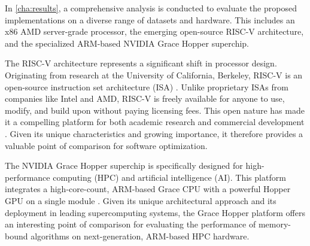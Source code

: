In \cref{cha:results}, a comprehensive analysis is conducted to evaluate the proposed implementations on a diverse range of datasets and hardware. This includes an x86 AMD server-grade processor, the emerging open-source RISC-V architecture, and the specialized ARM-based NVIDIA Grace Hopper superchip.

The RISC-V architecture represents a significant shift in processor design. Originating from research at the University of California, Berkeley, RISC-V is an open-source instruction set architecture (ISA) \cite{asanovic2014instruction}. Unlike proprietary ISAs from companies like Intel and AMD, RISC-V is freely available for anyone to use, modify, and build upon without paying licensing fees. This open nature has made it a compelling platform for both academic research and commercial development \cite{mezger2022survey}. Given its unique characteristics and growing importance, it therefore provides a valuable point of comparison for software optimization.

The NVIDIA Grace Hopper superchip is specifically designed for high-performance computing (HPC) and artificial intelligence (AI). This platform integrates a high-core-count, ARM-based Grace CPU with a powerful Hopper GPU on a single module \cite{elster2022nvidia}. Given its unique architectural approach and its deployment in leading supercomputing systems, the Grace Hopper platform offers an interesting point of comparison for evaluating the performance of memory-bound algorithms on next-generation, ARM-based HPC hardware.